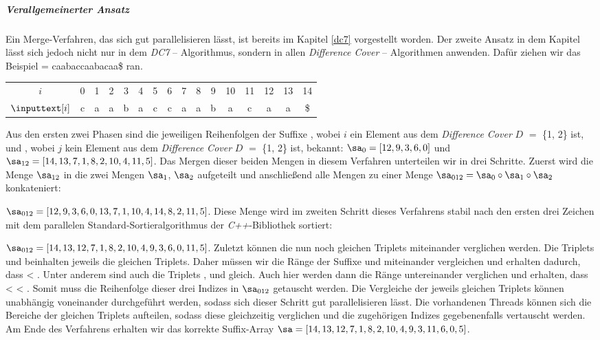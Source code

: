 \subparagraph*{Verallgemeinerter Ansatz}

Ein Merge-Verfahren, das sich gut parallelisieren lässt, ist bereits im Kapitel \ref{dc7} vorgestellt worden. Der zweite Ansatz in dem Kapitel lässt sich jedoch nicht nur in dem \emph{DC7} -- Algorithmus, sondern in allen \emph{Difference Cover} -- Algorithmen anwenden.
Dafür ziehen wir das Beispiel  = caabaccaabacaa\$ ran.

\begin{table}[H]
	\centering
	\begin{tabular}{c| c c c c c c c c c c c c c c c}
		$i$ & 0 & 1 & 2 & 3 & 4 & 5 & 6 & 7 & 8 & 9 & 10 & 11 & 12 & 13 & 14 \\
		$\inputtext[i]$ & c & a & a & b & a & c & c & a & a & b & a & c & a & a & \$
	\end{tabular}
\end{table}

Aus den ersten zwei Phasen sind die jeweiligen Reihenfolgen der Suffixe , wobei $i$ ein Element aus dem \emph{Difference Cover} \(D\) $=$ \{1, 2\} ist, und , wobei $j$ kein Element aus dem \emph{Difference Cover} \(D\) $=$ \{1, 2\} ist, bekannt:
$\sa_{0} = [12, 9, 3, 6, 0]$ und $\sa_{12} = [14, 13, 7, 1, 8, 2, 10, 4, 11, 5]$.
Das Mergen dieser beiden Mengen in diesem Verfahren unterteilen wir in drei Schritte. Zuerst wird die Menge $\sa_{12}$ in die zwei Mengen $\sa_1$, $\sa_2$ aufgeteilt und anschließend alle Mengen zu einer Menge $\sa_{012} = \sa_0 \circ \sa_1 \circ \sa_2$ konkateniert:

$\sa_{012} = [12, 9, 3, 6, 0, 13, 7, 1, 10, 4, 14, 8, 2, 11, 5]$.
Diese Menge wird im zweiten Schritt dieses Verfahrens stabil nach den ersten drei Zeichen mit dem pa\-ral\-lel\-en Standard-Sortieralgorithmus der \emph{C++}-Bibliothek sortiert:

$\sa_{012} = [14, 13, 12, 7, 1, 8, 2, 10, 4, 9, 3, 6, 0, 11, 5]$. Zuletzt können die nun noch gleichen Triplets miteinander verglichen werden. Die Triplets  und  beinhalten jeweils die gleichen Triplets. Daher müssen wir die Ränge der Suffixe  und  miteinander vergleichen und erhalten dadurch, dass  < . Unter anderem sind auch die Triplets ,  und  gleich. Auch hier werden dann die Ränge untereinander verglichen und erhalten, dass  <  < . Somit muss die Reihenfolge dieser drei Indizes in $\sa_{012}$ getauscht werden. Die Vergleiche der jeweils gleichen Triplets können unabhängig voneinander durchgeführt werden, sodass sich dieser Schritt gut parallelisieren lässt. Die vorhandenen Threads können sich die Bereiche der gleichen Triplets aufteilen, sodass diese gleichzeitig verglichen und die zugehörigen Indizes gegebenenfalls vertauscht werden. Am Ende des Verfahrens erhalten wir das korrekte Suffix-Array $\sa = [14, 13, 12, 7, 1, 8, 2, 10, 4, 9, 3, 11, 6, 0, 5]$.